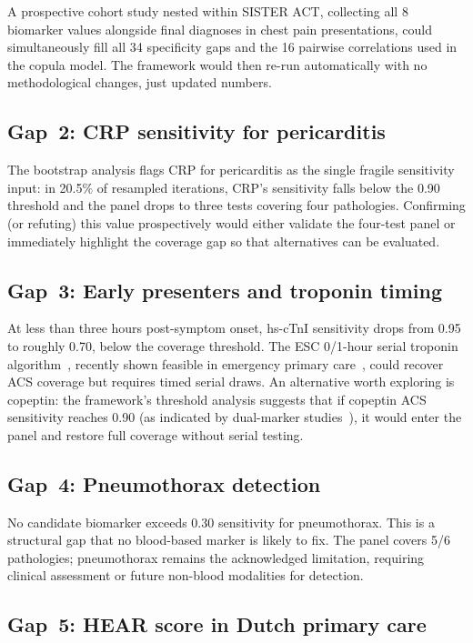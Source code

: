 \documentclass[11pt, oneside]{article}
\begin{document}
A prospective cohort study nested within SISTER ACT, collecting all 8 biomarker values alongside final diagnoses in chest pain presentations, could simultaneously fill all 34 specificity gaps and the 16 pairwise correlations used in the copula model. The framework would then re-run automatically with no methodological changes, just updated numbers.

\subsection{Gap~2: CRP sensitivity for pericarditis}

The bootstrap analysis flags CRP for pericarditis as the single fragile sensitivity input: in 20.5\% of resampled iterations, CRP's sensitivity falls below the 0.90 threshold and the panel drops to three tests covering four pathologies. Confirming (or refuting) this value prospectively would either validate the four-test panel or immediately highlight the coverage gap so that alternatives can be evaluated.

\subsection{Gap~3: Early presenters and troponin timing}

At less than three hours post-symptom onset, hs-cTnI sensitivity drops from 0.95 to roughly 0.70, below the coverage threshold. The ESC 0/1-hour serial troponin algorithm~\cite{Collet2021}, recently shown feasible in emergency primary care~\cite{Johannessen2025}, could recover ACS coverage but requires timed serial draws. An alternative worth exploring is copeptin: the framework's threshold analysis suggests that if copeptin ACS sensitivity reaches 0.90 (as indicated by dual-marker studies~\cite{Raskovalova2013,Mu2023,Giannitsis2021}), it would enter the panel and restore full coverage without serial testing.

\subsection{Gap~4: Pneumothorax detection}

No candidate biomarker exceeds 0.30 sensitivity for pneumothorax. This is a structural gap that no blood-based marker is likely to fix. The panel covers 5/6 pathologies; pneumothorax remains the acknowledged limitation, requiring clinical assessment or future non-blood modalities for detection.

\subsection{Gap~5: HEAR score in Dutch primary care}
\end{document}
